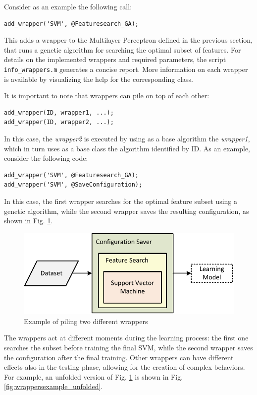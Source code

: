 \noindent Consider as an example the following call:
\begin{lstlisting}
add_wrapper('SVM', @Featuresearch_GA);
\end{lstlisting}

\noindent This adds a wrapper to the Multilayer Perceptron defined in the previous section, that runs a genetic algorithm for searching the optimal subset of features. For details on the implemented wrappers and required parameters, the script \verb|info_wrappers.m| generates a concise report. More information on each wrapper is available by visualizing the help for the corresponding class.

It is important to note that wrappers can pile on top of each other:

\begin{lstlisting}
add_wrapper(ID, wrapper1, ...);
add_wrapper(ID, wrapper2, ...);
\end{lstlisting}

In this case, the \textit{wrapper2} is executed by using as a base algorithm the \textit{wrapper1}, which in turn uses as a base class the algorithm identified by ID. As an example, consider the following code:

\begin{lstlisting}
add_wrapper('SVM', @Featuresearch_GA);
add_wrapper('SVM', @SaveConfiguration);
\end{lstlisting}

\noindent In this case, the first wrapper searches for the optimal feature subset using a genetic algorithm, while the second wrapper saves the resulting configuration, as shown in Fig. \ref{fig:wrappersexample}.

\begin{figure}[t]
\centering
\includegraphics[scale=0.6]{./images/WrappersExample}
\caption{Example of piling two different wrappers}
\label{fig:wrappersexample}
\end{figure}

\noindent The wrappers act at different moments during the learning process: the first one searches the subset before training the final SVM, while the second wrapper saves the configuration after the final training. Other wrappers can have different effects also in the testing phase, allowing for the creation of complex behaviors. For example, an unfolded version of Fig. \ref{fig:wrappersexample} is shown in Fig. \ref{fig:wrappersexample_unfolded}.

